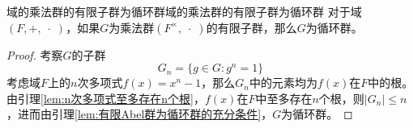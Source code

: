\begin{theorem}{域的乘法群的有限子群为循环群}{域的乘法群的有限子群为循环群}
	对于域$(F,+,\;\cdot\;)$，如果$G$为乘法群$(F^{\times},\;\cdot\;)$的有限子群，那么$G$为循环群。
\end{theorem}

\begin{proof}
	考察$G$的子群
	$$
	G_n=\{ g\in G:g^n=1 \}
	$$
	考虑域$F$上的$n$次多项式$f(x)=x^n-1$，那么$G_n$中的元素均为$f(x)$在$F$中的根。由引理\ref{lem:n次多项式至多存在n个根}，$f(x)$在$F$中至多存在$n$个根，则$|G_n|\le n$，进而由引理\ref{lem:有限Abel群为循环群的充分条件}，$G$为循环群。
\end{proof}

% 
